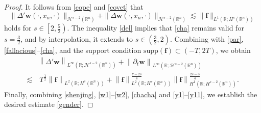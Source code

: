 \documentclass[preprint,compress,12pt]{elsarticle}
\numberwithin{equation}{section}
\begin{document}
\begin{proof}
	It follows from \eqref{cope} and \eqref{covet} that
	\begin{equation}\label{cha}			\|\Delta'\boldsymbol{w}(\cdot,x_{n},\cdot)\|_{\mathcal{H}^{s-2}(\mathbb{R}^{n})}+ \|\Delta\boldsymbol{w}(\cdot,x_{n},\cdot)\|_{\mathcal{H}^{s-2}(\mathbb{R}^{n})}\lesssim\|\boldsymbol{f}\|_{L^{1}(\mathbb{R};H^{s}(\mathbb{R}^{n}))}
	\end{equation}
	holds for $s\in \left[2,\frac{5}{2}\right)$. The inequality \eqref{del} implies that \eqref{cha} remains valid for $s=\frac{3}{2}$, and by interpolation, it extends to $s\in \left(\frac{3}{2},2\right)$. Combining with \eqref{par}, \eqref{fallacious}--\eqref{cha}, and  the support condition $\text{supp} (\boldsymbol{f})\subset(-T,2T)$, we obtain
	\begin{equation}\label{chacha}
		\begin{aligned}			&\left\|\Delta'\boldsymbol{w}\right\|_{L^{\infty}(\mathbb{R};\mathcal{H}^{s-2}(\mathbb{R}^{n}))}+\left\|\partial_{t}\boldsymbol{w}\right\|_{L^{\infty}(\mathbb{R};\mathcal{H}^{s-2}(\mathbb{R}^{n}))}\\
			\lesssim &\ T^{\frac{1}{2}}\left\|\boldsymbol{f}\right\|_{L^{2}(\mathbb{R};H^{s}(\mathbb{R}^{n}))}+\left\|\boldsymbol{f}\right\|_{L^{2}(\mathbb{R};H^{s}(\mathbb{R}^{n}))}^{\frac{7-2s}{4}} \left\|\boldsymbol{f}\right\|_{H^{1}(\mathbb{R};H^{s-2}(\mathbb{R}^{n}))}^{\frac{2s-3}{4}}.
		\end{aligned}
	\end{equation}
	Finally, combining \eqref{shenjing},  \eqref{w1}--\eqref{w2}, \eqref{chacha} and \eqref{y1}--\eqref{y11}, we establish the desired estimate \eqref{gender}.
\end{proof}
\end{document}
